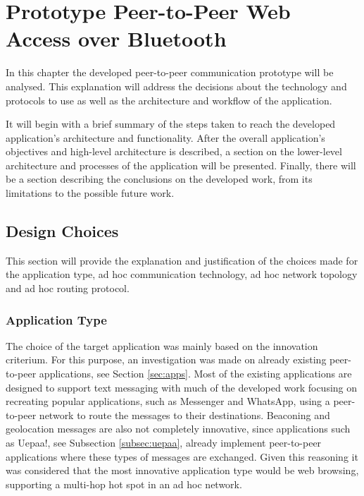\chapter{Prototype Peer-to-Peer Web Access over Bluetooth}
\label{chapter:work}

In this chapter the developed peer-to-peer communication prototype will be analysed. This explanation will address the decisions about the technology and protocols to use as well as the architecture and workflow of the application.

It will begin with a brief summary of the steps taken to reach the developed application's architecture and functionality. After the overall application's objectives and high-level architecture is described, a section on the lower-level architecture and processes of the application will be presented. Finally, there will be a section describing the conclusions on the developed work, from its limitations to the possible future work.

\section{Design Choices}

This section will provide the explanation and justification of the choices made for the application type, ad hoc communication technology, ad hoc network topology and ad hoc routing protocol.

\subsection{Application Type}

The choice of the target application was mainly based on the innovation criterium. For this purpose, an investigation was made on already existing peer-to-peer applications, see Section \ref{sec:apps}. Most of the existing applications are designed to support text messaging with much of the developed work focusing on recreating popular applications, such as Messenger and WhatsApp, using a peer-to-peer network to route the messages to their destinations. Beaconing and geolocation messages are also not completely innovative, since applications such as Uepaa!, see Subsection \ref{subsec:uepaa}, already implement peer-to-peer applications where these types of messages are exchanged. Given this reasoning it was considered that the most innovative application type would be web browsing, supporting a multi-hop hot spot in an ad hoc network.

